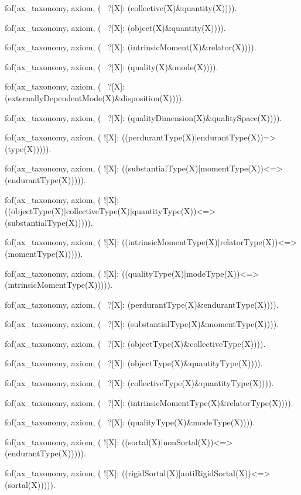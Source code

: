 fof(ax_taxonomy, axiom, (
    ~?[X]: (collective(X)&quantity(X)))).


fof(ax_taxonomy, axiom, (
    ~?[X]: (object(X)&quantity(X)))).

fof(ax_taxonomy, axiom, (
    ~?[X]: (intrinsicMoment(X)&relator(X)))).


fof(ax_taxonomy, axiom, (
    ~?[X]: (quality(X)&mode(X)))).

fof(ax_taxonomy, axiom, (
    ~?[X]: (externallyDependentMode(X)&disposition(X)))).

fof(ax_taxonomy, axiom, (
    ~?[X]: (qualityDimension(X)&qualitySpace(X)))).





fof(ax_taxonomy, axiom, (
![X]: ((perdurantType(X)|endurantType(X))=>(type(X))))).

fof(ax_taxonomy, axiom, (
![X]: ((substantialType(X)|momentType(X))<=>(endurantType(X))))).

fof(ax_taxonomy, axiom, (
![X]: ((objectType(X)|collectiveType(X)|quantityType(X))<=>(substantialType(X))))).

fof(ax_taxonomy, axiom, (
![X]: ((intrinsicMomentType(X)|relatorType(X))<=>(momentType(X))))).

fof(ax_taxonomy, axiom, (
![X]: ((qualityType(X)|modeType(X))<=>(intrinsicMomentType(X))))).



fof(ax_taxonomy, axiom, (
    ~?[X]: (perdurantType(X)&endurantType(X)))).

fof(ax_taxonomy, axiom, (
    ~?[X]: (substantialType(X)&momentType(X)))).

fof(ax_taxonomy, axiom, (
    ~?[X]: (objectType(X)&collectiveType(X)))).


fof(ax_taxonomy, axiom, (
    ~?[X]: (objectType(X)&quantityType(X)))).

fof(ax_taxonomy, axiom, (
    ~?[X]: (collectiveType(X)&quantityType(X)))).

fof(ax_taxonomy, axiom, (
        ~?[X]: (intrinsicMomentType(X)&relatorType(X)))).

fof(ax_taxonomy, axiom, (
        ~?[X]: (qualityType(X)&modeType(X)))).




fof(ax_taxonomy, axiom, (
![X]: ((sortal(X)|nonSortal(X))<=>(endurantType(X))))).

fof(ax_taxonomy, axiom, (
![X]: ((rigidSortal(X)|antiRigidSortal(X))<=>(sortal(X))))).


